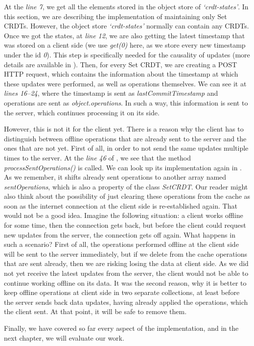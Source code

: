 At the \textit{line 7}, we get all the elements stored in the object store of \textit{`crdt-states'}. In this section, we are describing the implementation of maintaining only Set CRDTs. However, the object store \textit{`crdt-states'} normally can contain any CRDTs. Once we got the states, at \textit{line 12}, we are also getting the latest timestamp that was stored on a client side (we use \textit{get(0)} here, as we store every new timestamp under the id \textit{0}). This step is specifically needed for the causality of updates (more details are available in ). Then, for every Set CRDT, we are creating a POST HTTP request, which contains the information about the timestamp at which these updates were performed, as well as operations themselves. We can see it at \textit{lines 16--24}, where the timestamp is sent as \textit{lastCommitTimestamp} and operations are sent as \textit{object.operations}. In such a way, this information is sent to the server, which continues processing it on its side.

However, this is not it for the client yet. There is a reason why the client has to distinguish between offline operations that are already sent to the server and the ones that are not yet. First of all, in order to not send the same updates multiple times to the server. At the \textit{line 46} of , we see that the method \textit{processSentOperations()} is called. We can look up its implementation again in . As we remember, it shifts already sent operations to another array named \textit{sentOperations}, which is also a property of the class \textit{SetCRDT}. Our reader might also think about the possibility of just clearing these operations from the cache as soon as the internet connection at the client side is re-established again. That would not be a good idea. Imagine the following situation: a client works offline for some time, then the connection gets back, but before the client could request new updates from the server, the connection gets off again. What happens in such a scenario? First of all, the operations performed offline at the client side will be sent to the server immediately, but if we delete from the cache operations that are sent already, then we are risking losing the data at client side. As we did not yet receive the latest updates from the server, the client would not be able to continue working offline on its data. It was the second reason, why it is better to keep offline operations at client side in two separate collections, at least before the server sends back data updates, having already applied the operations, which the client sent. At that point, it will be safe to remove them.

Finally, we have covered so far every aspect of the implementation, and in the next chapter, we will evaluate our work.